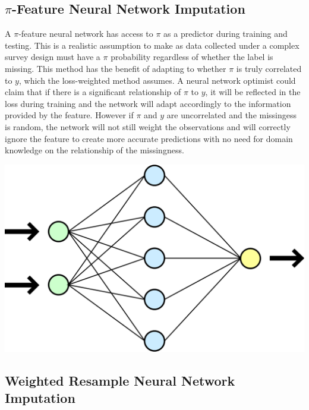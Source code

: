 \documentclass[12pt,twoside]{reedthesis}
\begin{document}
\subsection{\texorpdfstring{\(\pi\)-Feature Neural Network
Imputation}{\textbackslash{}pi-Feature Neural Network Imputation}}\label{pi-feature-neural-network-imputation}

A \(\pi\)-feature neural network has access to \(\pi\) as a predictor
during training and testing. This is a realistic assumption to make as
data collected under a complex survey design must have a \(\pi\)
probability regardless of whether the label is missing. This method has
the benefit of adapting to whether \(\pi\) is truly correlated to \(y\),
which the loss-weighted method assumes. A neural network optimist could
claim that if there is a significant relationship of \(\pi\) to \(y\),
it will be reflected in the loss during training and the network will
adapt accordingly to the information provided by the feature. However if
\(\pi\) and \(y\) are uncorrelated and the missingess is random, the
network will not still weight the observations and will correctly ignore
the feature to create more accurate predictions with no need for domain
knowledge on the relationship of the missingness.

\includegraphics[width=0.8\linewidth]{figure/network}

\subsection{Weighted Resample Neural Network
Imputation}\label{weighted-resample-neural-network-imputation}
\end{document}
